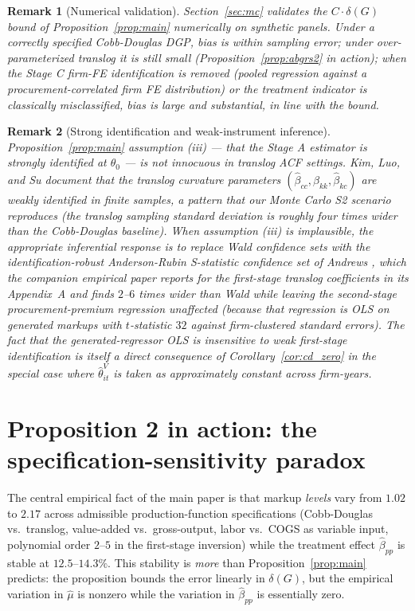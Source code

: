 \documentclass[11pt]{article}
\newtheorem{remark}{Remark}
\begin{document}
\begin{remark}[Numerical validation]\label{rem:mc_cross_ref}
Section~\ref{sec:mc} validates the $C\cdot\delta(G)$ bound of Proposition~\ref{prop:main} numerically on synthetic panels. Under a correctly specified Cobb-Douglas DGP, bias is within sampling error; under over-parameterized translog it is still small (Proposition~\ref{prop:abgrs2} in action); when the Stage C firm-FE identification is removed (pooled regression against a procurement-correlated firm FE distribution) or the treatment indicator is classically misclassified, bias is large and substantial, in line with the bound.
\end{remark}

\begin{remark}[Strong identification and weak-instrument inference]\label{rem:weak_id}
Proposition~\ref{prop:main} assumption (iii) --- that the Stage A estimator is strongly identified at $\theta_0$ --- is not innocuous in translog ACF settings. Kim, Luo, and Su \cite{KimLuoSu2019JAE} document that the translog curvature parameters $(\hat\beta_{cc}, \hat\beta_{kk}, \hat\beta_{kc})$ are weakly identified in finite samples, a pattern that our Monte Carlo S2 scenario reproduces (the translog sampling standard deviation is roughly four times wider than the Cobb-Douglas baseline). When assumption (iii) is implausible, the appropriate inferential response is to replace Wald confidence sets with the identification-robust Anderson-Rubin S-statistic confidence set of Andrews \cite{Andrews2017ECMA}, which the companion empirical paper reports for the first-stage translog coefficients in its Appendix~A and finds $2$--$6$ times wider than Wald while leaving the second-stage procurement-premium regression unaffected (because that regression is OLS on generated markups with $t$-statistic $32$ against firm-clustered standard errors). The fact that the generated-regressor OLS is insensitive to weak first-stage identification is itself a direct consequence of Corollary~\ref{cor:cd_zero} in the special case where $\hat\theta^V_{it}$ is taken as approximately constant across firm-years.
\end{remark}

\section{Proposition 2 in action: the specification-sensitivity paradox}\label{sec:prop2}

The central empirical fact of the main paper is that markup \emph{levels} vary from $1.02$ to $2.17$ across admissible production-function specifications (Cobb-Douglas vs.\ translog, value-added vs.\ gross-output, labor vs.\ COGS as variable input, polynomial order $2$--$5$ in the first-stage inversion) while the treatment effect $\hat\beta_{pp}$ is stable at $12.5$--$14.3\%$. This stability is \emph{more} than Proposition~\ref{prop:main} predicts: the proposition bounds the error linearly in $\delta(G)$, but the empirical variation in $\hat\mu$ is nonzero while the variation in $\hat\beta_{pp}$ is essentially zero.
\end{document}
